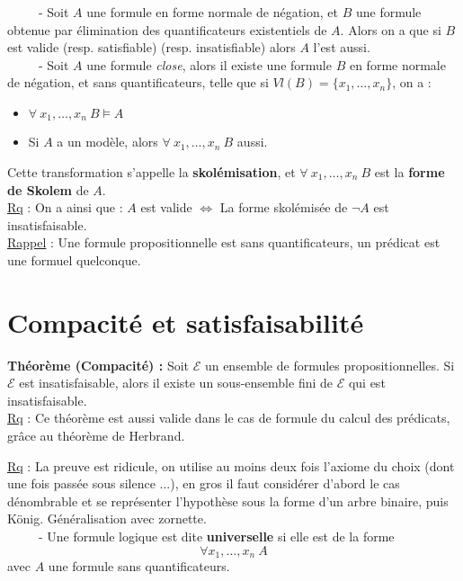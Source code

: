 \documentclass[11pt,a4paper]{article}
\begin{document}
\ \ \ \ \ - Soit $A$ une formule en forme normale de négation, et $B$ une formule obtenue par élimination des quantificateurs existentiels de $A$. Alors on a que si $B$ est valide (resp. satisfiable) (resp. insatisfiable) alors $A$ l'est aussi. 
\\

\ \ \ \ \ - Soit $A$ une formule \textit{close}, alors il existe une formule $B$ en forme normale de négation, et sans quantificateurs, telle que si $Vl(B)=\{x_1,\dots,x_n\}$, on a :
\begin{itemize}
\item $\forall \ x_1,\dots,x_n \ B \models A$
\item Si $A$ a un modèle, alors $\forall \ x_1,\dots,x_n \ B $ aussi.
\end{itemize}
Cette transformation s'appelle la \textbf{skolémisation}, et $\forall \ x_1,\dots,x_n \ B$ est la \textbf{forme de Skolem} de $A$. \\

\underline{Rq} : On a ainsi que : $A$ est valide $\Leftrightarrow$ La forme skolémisée de $\lnot A$ est insatisfaisable. \\
\underline{Rappel} : Une formule propositionnelle est sans quantificateurs, un prédicat est une formuel quelconque. \\

\section{Compacité et satisfaisabilité}

\textbf{Théorème (Compacité) :} Soit $\mathcal{E}$ un ensemble de formules propositionnelles. Si $\mathcal{E}$ est insatisfaisable, alors il existe un sous-ensemble fini de $\mathcal{E}$ qui est insatisfaisable. \\

\underline{Rq} : Ce théorème est aussi valide dans le cas de formule du calcul des prédicats, grâce au théorème de Herbrand.

\underline{Rq} : La preuve est ridicule, on utilise au moins deux fois l'axiome du choix (dont une fois passée sous silence ...), en gros il faut considérer d'abord le cas dénombrable et se représenter l'hypothèse sous la forme d'un arbre binaire, puis König. Généralisation avec zornette. \\

\ \ \ \ \ - Une formule logique est dite \textbf{universelle} si elle est de la forme \[\forall x_1,\dots,x_n \ A\] avec $A$ une formule sans quantificateurs. \\
\end{document}
